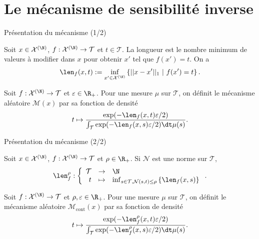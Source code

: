 \documentclass[10pt,serif]{beamer}
\begin{document}
\section{Le mécanisme de sensibilité inverse}
  \begin{frame}{Présentation du mécanisme (1/2)}
    \begin{definition}[Longueur]
      Soit \(x \in \mathcal X^{(\N)}\), \(f : \mathcal X^{(\N)} \to \mathcal T\) et \(t \in \mathcal T\). La longueur est le nombre minimum de valeurs à modifier dans \(x\) pour obtenir \(x'\) tel que \(f(x') = t\). On a 
      \[
          \len_f(x,t) := \inf_{x' \in \mathcal X^{(\N)}}\left\{|| x - x'||_1 \ |\ f(x') = t \right\}.
      \]
    \end{definition}
    
    \begin{definition}
        Soit \(f : \mathcal X^{(\N)} \to \mathcal T\) et \(\varepsilon \in \R_+\). Pour une mesure \(\mu\) sur \(\mathcal T\), on définit le mécanisme aléatoire \(\mathcal M(x)\) par sa fonction de densité 
        \[
            t \mapsto \dfrac{\exp(-\len_f(x, t)\varepsilon/2)}{\int_\mathcal T \exp(-\len_f(x, s)\varepsilon/2)\dt \mu(s)}.
        \] 
    \end{definition}
  \end{frame}

  \begin{frame}{Présentation du mécanisme (2/2)}
    \begin{definition}
      Soit \(x \in \mathcal X^{(\N)}\), \(f : \mathcal X^{(\N)} \to \mathcal T\) et \(\rho \in \R_+\). Si \(\mathcal N\) est une norme sur \(\mathcal T\),
      \[
          \len_f^{\rho} : 
          \left\{
              \begin{array}[]{rcl}
                  \mathcal T & \to & \N\\
                  t & \mapsto & \inf_{s \in \mathcal T, \mathcal N(s,t) \leq \rho}\left\{\len_f(x,s) \right\}  
              \end{array}
          \right. .   
      \]
    \end{definition}
    
    \begin{definition}
        Soit \(f : \mathcal X^{(\N)} \to \mathcal T\) et \(\rho, \varepsilon \in \R_+\). Pour une mesure \(\mu\) sur \(\mathcal T\), on définit le mécanisme aléatoire \(\mathcal M_{\text{cont}}(x)\) par sa fonction de densité 
        \[
            t \mapsto \dfrac{\exp(-\len_f^\rho(x, t)\varepsilon/2)}{\int_\mathcal T \exp(-\len_f^\rho(x, s)\varepsilon/2)\dt \mu(s)}.   
        \] 
    \end{definition}
  \end{frame}
\end{document}
